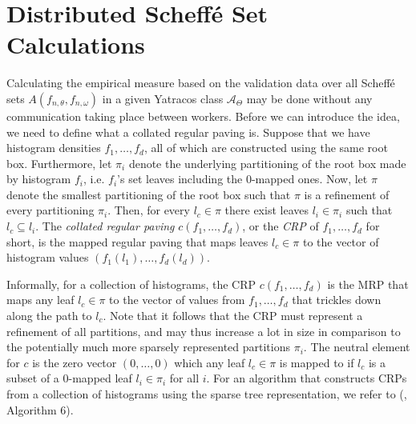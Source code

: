 \documentclass{report}
\begin{document}
\section{Distributed Scheffé Set Calculations}
Calculating the empirical measure based on the validation data over all Scheffé sets $A(f_{n,\theta},f_{n,\omega})$ in
a given Yatracos class $\mathcal{A}_\Theta$ may
be done without any communication taking place between workers. Before we can introduce the idea,
we need to define what a collated regular paving is.
{
	Suppose that we have histogram densities $f_1,\dots,f_d$, all of which are constructed using the same root box. Furthermore, 
	let $\pi_i$ denote the underlying partitioning of the root box made by histogram $f_i$, i.e. $f_i$'s set leaves including the 0-mapped ones. Now, let $\pi$ denote the smallest partitioning of 
	the root box such that $\pi$ is a refinement of every partitioning $\pi_i$. Then, for every $l_c \in \pi$ there exist leaves $l_i \in \pi_i$ such that $l_c \subseteq l_i$. 
	The \textit{collated regular paving} $c(f_1,\dots,f_d)$, or the \textit{CRP} of $f_1,\dots,f_d$
	for short, is the mapped regular paving that maps leaves $l_c \in \pi$ to the vector of histogram values  $(f_1(l_1),\dots,f_d(l_d))$.
}

{
	Informally, for a collection of histograms, the CRP $c(f_1,\dots,f_d)$ is the MRP that maps any leaf $l_c \in \pi$ to the vector of values from $f_1,\dots,f_d$ that trickles down along the path to $l_c$.
	Note that it follows that the CRP must represent a refinement of all partitions, and may thus increase a lot in size in comparison to the potentially much more sparsely represented partitions $\pi_i$. The neutral element
	for $c$ is the zero vector $(0,\dots,0)$ which any leaf $l_c \in \pi$ is mapped to if $l_c$ is a subset of a 0-mapped leaf $l_i \in \pi_i$ for all $i$.
	For an algorithm that constructs CRPs from a collection of histograms using the sparse tree representation, we refer to (\cite{Scalable Algorithms}, Algorithm 6).
}
\end{document}
